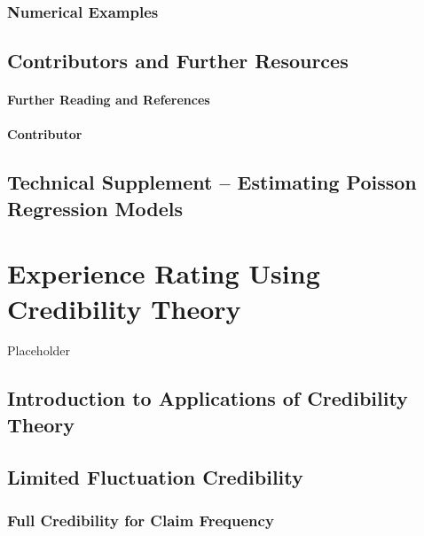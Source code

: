 \documentclass[]{book}
\theoremstyle{definition}
\theoremstyle{definition}
\theoremstyle{definition}
\theoremstyle{remark}
\begin{document}
\subsection{Numerical Examples}\label{numerical-examples}

\section{Contributors and Further
Resources}\label{RC:further-reading-and-resources}

\subsubsection*{Further Reading and
References}\label{further-reading-and-references}

\subsubsection*{Contributor}\label{contributor}

\section{Technical Supplement -- Estimating Poisson Regression
Models}\label{S:RC:mle-Pois-reg}

\chapter{Experience Rating Using Credibility
Theory}\label{C:Credibility}

Placeholder

\section{Introduction to Applications of Credibility
Theory}\label{introduction-to-applications-of-credibility-theory}

\section{Limited Fluctuation
Credibility}\label{limited-fluctuation-credibility}

\subsection{Full Credibility for Claim Frequency}\label{S:frequency}
\end{document}
